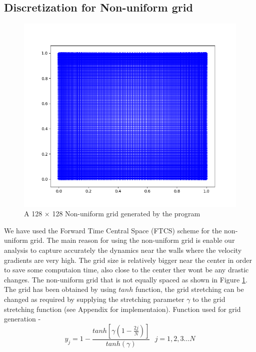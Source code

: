 \documentclass{article}
\begin{document}
\subsection{Discretization for Non-uniform grid}
\begin{figure}[h!]
\centering
\includegraphics[scale=.5]{Figure_1.png}
\caption{A 128 $\times$ 128 Non-uniform grid generated by the program}
\label{fig:gridImage}
\end{figure}

We have used the Forward Time Central Space (FTCS) scheme for the non-uniform grid. The main reason for using the non-uniform grid is enable our analysis to capture accurately the dynamics near the walls where the velocity gradients are very high. The grid size is relatively bigger near the center in order to save some computaion time, also close to the center ther wont be any drastic changes. The non-uniform grid that is not equally spaced as shown in Figure \ref{fig:gridImage}. The grid has been obtained by using $tanh$ function, the grid stretching can be changed as required by supplying the stretching parameter $\gamma$ to the grid stretching function (see Appendix for implementaion). Function used for grid generation -  
\begin{equation}
y_j = 1- \frac{tanh\left[\gamma\left(1-\frac{2j}{N}\right)\right]}{tanh(\gamma)} \text{   }  j =1,2,3 \dots N
\end{equation}
\end{document}
